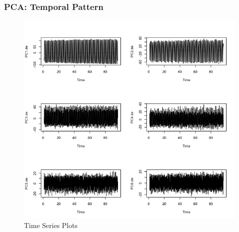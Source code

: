 \documentclass{beamer}
\begin{document}
%
%
%
\begin{frame}
\frametitle{PCA: Temporal Pattern}
\begin{figure}
	\centering
	\includegraphics[width=0.7\linewidth]{../img/PCA_ts}
	\caption{Time Series Plots}
	\label{fig:pcats}
\end{figure}
\end{frame}
\end{document}
